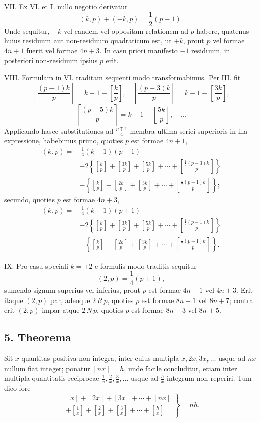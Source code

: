 \documentclass[12pt]{article}
\begin{document}
VII. Ex VI. et I. nullo negotio derivatur
\[
(k,p)+(-k,p)=\frac12(p-1).
\]
Unde sequitur, $-k$ vel eandem vel oppositam relationem ad $p$ habere, quatenus huius residuum aut non-residuum quadraticum est, ut $+k$, prout $p$ vel formae $4n+1$ fuerit vel formae $4n+3$. In casu priori manifesto $-1$ residuum, in posteriori non-residuum ipsius $p$ erit.

VIII. Formulam in VI. traditam sequenti modo transformabimus. Per III. fit
\[
\left[\frac{(p-1)k}{p}\right]=k-1-\left[\frac{k}{p}\right],\quad
\left[\frac{(p-3)k}{p}\right]=k-1-\left[\frac{3k}{p}\right],
\]
\[
\left[\frac{(p-5)k}{p}\right]=k-1-\left[\frac{5k}{p}\right],\quad\ldots
\]
Applicando hasce substitutiones ad $\frac{p\mp1}{4}$ membra ultima seriei superioris in illa expressione, habebimus primo, quoties $p$ est formae $4n+1$,
\[
\begin{aligned}
(k,p)=&\ \frac14(k-1)(p-1)\\
&-2\left\{\left[\frac{k}{p}\right]+\left[\frac{3k}{p}\right]+\left[\frac{5k}{p}\right]+\cdots+\left[\frac{\frac12(p-3)k}{p}\right]\right\}\\
&-\left\{\left[\frac{k}{p}\right]+\left[\frac{2k}{p}\right]+\left[\frac{3k}{p}\right]+\cdots+\left[\frac{\frac12(p-1)k}{p}\right]\right\};
\end{aligned}
\]
secundo, quoties $p$ est formae $4n+3$,
\[
\begin{aligned}
(k,p)=&\ \frac14(k-1)(p+1)\\
&-2\left\{\left[\frac{k}{p}\right]+\left[\frac{3k}{p}\right]+\left[\frac{5k}{p}\right]+\cdots+\left[\frac{\frac12(p-1)k}{p}\right]\right\}\\
&-\left\{\left[\frac{k}{p}\right]+\left[\frac{2k}{p}\right]+\left[\frac{3k}{p}\right]+\cdots+\left[\frac{\frac12(p-1)k}{p}\right]\right\}.
\end{aligned}
\]

IX. Pro casu speciali $k=+2$ e formulis modo traditis sequitur
\[
(2,p)=\frac14(p\mp1),
\]
sumendo signum superius vel inferius, prout $p$ est formae $4n+1$ vel $4n+3$. Erit itaque $(2,p)$ par, adeoque $2\,R\,p$, quoties $p$ est formae $8n+1$ vel $8n+7$; contra erit $(2,p)$ impar atque $2\,N\,p$, quoties $p$ est formae $8n+3$ vel $8n+5$.

\subsection*{5. Theorema}

Sit $x$ quantitas positiva non integra, inter cuius multipla $x,2x,3x,\ldots$ usque ad $nx$ nullum fiat integer; ponatur $[nx]=h$, unde facile concluditur, etiam inter multipla quantitatis reciprocae $\frac1x,\frac2x,\frac3x,\ldots$ usque ad $\frac hx$ integrum non reperiri. Tum dico fore
\[
\left.
\begin{array}{l}
[x]+[2x]+[3x]+\cdots+[nx]\\
+\left[\frac1x\right]+\left[\frac2x\right]+\left[\frac3x\right]+\cdots+\left[\frac hx\right]
\end{array}
\right\}=nh.
\]
\end{document}
